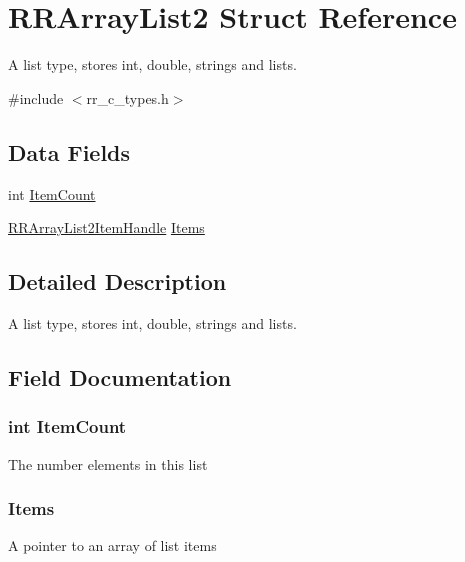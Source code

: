 \hypertarget{struct_r_r_array_list2}{
\section{\-R\-R\-Array\-List2 \-Struct \-Reference}
\label{struct_r_r_array_list2}
}


\-A list type, stores int, double, strings and lists.  




{\ttfamily \#include $<$rr\-\_\-c\-\_\-types.\-h$>$}

\subsection*{\-Data \-Fields}
\begin{DoxyCompactItemize}
\item 
int \hyperlink{struct_r_r_array_list2_ab970c710c7f3897df3c63f76dc5a0793}{\-Item\-Count}
\item 
\hyperlink{rr__c__types_8h_a98a79f5d723f2b60fd6db9c3c6dfa20a}{\-R\-R\-Array\-List2\-Item\-Handle} \hyperlink{struct_r_r_array_list2_aff798cb8027dcb29fd09e5396f8428fe}{\-Items}
\end{DoxyCompactItemize}


\subsection{\-Detailed \-Description}
\-A list type, stores int, double, strings and lists. 

\subsection{\-Field \-Documentation}
\hypertarget{struct_r_r_array_list2_ab970c710c7f3897df3c63f76dc5a0793}{
\subsubsection[{\-Item\-Count}]{\setlength{\rightskip}{0pt plus 5cm}int {\bf \-Item\-Count}}}
\label{struct_r_r_array_list2_ab970c710c7f3897df3c63f76dc5a0793}
\-The number elements in this list \hypertarget{struct_r_r_array_list2_aff798cb8027dcb29fd09e5396f8428fe}{
\subsubsection[{\-Items}]{ {\bf \-Items}}}
\label{struct_r_r_array_list2_aff798cb8027dcb29fd09e5396f8428fe}
\-A pointer to an array of list items 

